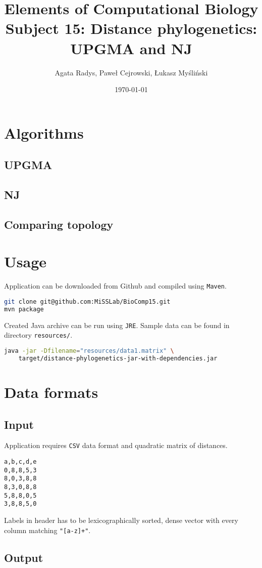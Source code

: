 \documentclass[a4paper,10pt]{article}
\title{Elements of Computational Biology\\ \Large
Subject 15: Distance phylogenetics: UPGMA and NJ}
\author{Agata Radys, Paweł Cejrowski, Łukasz Myśliński}
\date{\today}
\begin{document}
\maketitle

\section{Algorithms}

\subsection{UPGMA}
\subsection{NJ}
\subsection{Comparing topology}

\section{Usage}
Application can be downloaded from Github and compiled using \texttt{Maven}.
\begin{lstlisting}[language=bash,caption={Building project}]
git clone git@github.com:MiSSLab/BioComp15.git
mvn package
\end{lstlisting}
Created Java archive can be run using \texttt{JRE}. Sample data can be found in directory \texttt{resources/}.
\begin{lstlisting}[language=bash,caption={Running project using data1.matrix}]
java -jar -Dfilename="resources/data1.matrix" \
    target/distance-phylogenetics-jar-with-dependencies.jar
\end{lstlisting}

\section{Data formats}
\subsection{Input}
Application requires \texttt{CSV} data format and quadratic matrix of distances.

\begin{lstlisting}[caption={Example data file content}]
a,b,c,d,e
0,8,8,5,3
8,0,3,8,8
8,3,0,8,8
5,8,8,0,5
3,8,8,5,0
\end{lstlisting}
Labels in header has to be lexicographically sorted, dense vector with every column matching \texttt{"[a-z]+"}.
\subsection{Output}
\end{document}
